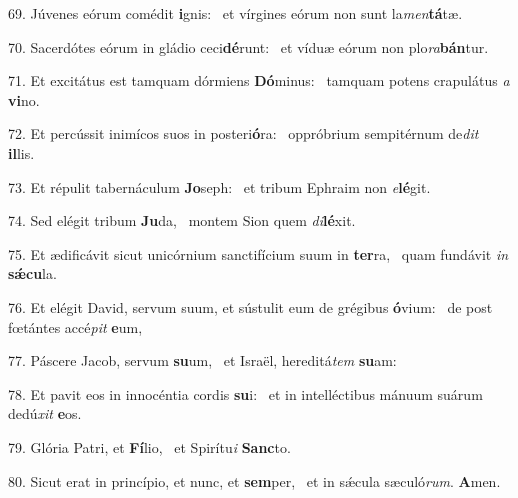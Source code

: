 69. Júvenes eórum comédit \textbf{i}gnis: \ast\  et vírgines eórum non sunt la\textit{men}\textbf{tá}tæ.\

70. Sacerdótes eórum in gládio ceci\textbf{dé}runt: \ast\  et víduæ eórum non plo\textit{ra}\textbf{bán}tur.\

71. Et excitátus est tamquam dórmiens \textbf{Dó}minus: \ast\  tamquam potens crapulátus \textit{a} \textbf{vi}no.\

72. Et percússit inimícos suos in posteri\textbf{ó}ra: \ast\  oppróbrium sempitérnum de\textit{dit} \textbf{il}lis.\

73. Et répulit tabernáculum \textbf{Jo}seph: \ast\  et tribum Ephraim non \textit{e}\textbf{lé}git.\

74. Sed elégit tribum \textbf{Ju}da, \ast\  montem Sion quem \textit{di}\textbf{lé}xit.\

75. Et ædificávit sicut unicórnium sanctifícium suum in \textbf{ter}ra, \ast\  quam fundávit \textit{in} \textbf{sǽ}\textbf{cu}la.\

76. Et elégit David, servum suum, et sústulit eum de grégibus \textbf{ó}vium: \ast\  de post fœtántes accé\textit{pit} \textbf{e}um,\

77. Páscere Jacob, servum \textbf{su}um, \ast\  et Israël, hereditá\textit{tem} \textbf{su}am:\

78. Et pavit eos in innocéntia cordis \textbf{su}i: \ast\  et in intelléctibus mánuum suárum dedú\textit{xit} \textbf{e}os.\

79. Glória Patri, et \textbf{Fí}lio, \ast\  et Spirítu\textit{i} \textbf{Sanc}to.\

80. Sicut erat in princípio, et nunc, et \textbf{sem}per, \ast\  et in sǽcula sæculó\textit{rum}. \textbf{A}men.\

